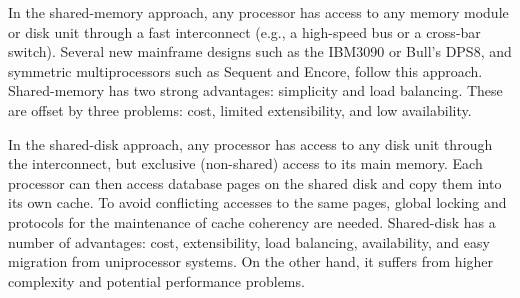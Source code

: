 \documentclass{article}
\begin{document}
In the shared-memory approach, any processor has access to any memory module or disk unit through
a fast interconnect (e.g., a high-speed bus or a cross-bar switch). Several new mainframe designs such
as the IBM3090 or Bull’s DPS8, and symmetric multiprocessors such as Sequent and Encore, follow this
approach. Shared-memory has two strong advantages: simplicity and load balancing. These are offset by
three problems: cost, limited extensibility, and low availability.


In the shared-disk approach, any processor has access to any disk unit through the interconnect, but
exclusive (non-shared) access to its main memory. Each processor can then access database pages on the
shared disk and copy them into its own cache. To avoid conflicting accesses to the same pages, global
locking and protocols for the maintenance of cache coherency are needed. Shared-disk has a number of
advantages: cost, extensibility, load balancing, availability, and easy migration from uniprocessor systems.
On the other hand, it suffers from higher complexity and potential performance problems.
\end{document}
